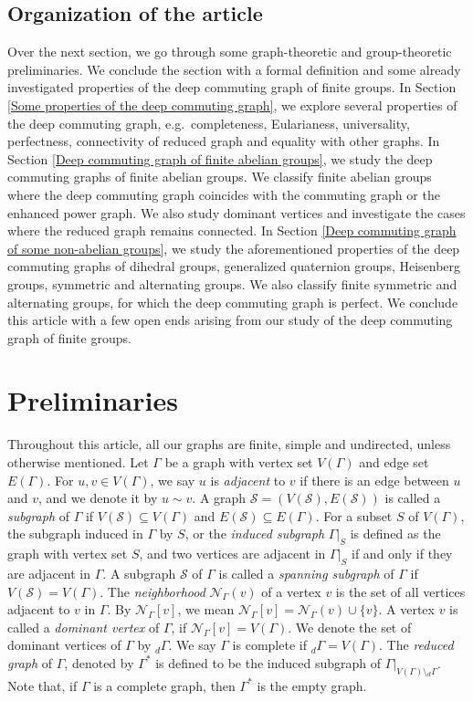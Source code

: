 \documentclass[12pt,a4paper]{article}
\begin{document}
\subsection{Organization of the article}

Over the next section, we go through some graph-theoretic and group-theoretic preliminaries. We conclude the section with a formal definition and some already investigated properties of the deep commuting graph of finite groups. In Section \ref{Some properties of the deep commuting graph}, we explore several properties of the deep commuting graph, e.g.~completeness, Eularianess, universality, perfectness, connectivity of reduced graph and equality with other graphs. In Section \ref{Deep commuting graph of finite abelian groups}, we study the deep commuting graphs of finite abelian groups. We classify finite abelian groups where the deep commuting graph coincides with the commuting graph or the enhanced power graph. We also study dominant vertices and investigate the cases where the reduced graph remains connected. In Section \ref{Deep commuting graph of some non-abelian groups}, we study the aforementioned properties of the deep commuting graphs of dihedral groups, generalized quaternion groups, Heisenberg groups, symmetric and alternating groups. We also classify finite symmetric and alternating groups, for which the deep commuting graph is perfect. We conclude this article with a few open ends arising from our study of the deep commuting graph of finite groups.

\section{Preliminaries}\label{Preliminaries}

Throughout this article, all our graphs are finite, simple and undirected, unless otherwise mentioned. Let $\Gamma$ be a graph with vertex set $V(\Gamma)$ and edge set $E(\Gamma)$. For $u,v\in V(\Gamma)$, we say $u$ is \emph{adjacent} to $v$ if there is an edge between $u$ and $v$, and we denote it by $u \sim v$.  A graph $\mathcal{S}=(V(\mathcal{S}),E(\mathcal{S}))$ is called a \textit{subgraph} of $\Gamma$ if $V(\mathcal{S})\subseteq V(\Gamma)$ and $E(\mathcal{S})\subseteq E(\Gamma)$. For a subset $S$ of $V(\Gamma)$, the subgraph induced in $\Gamma$ by $S$, or the \textit{induced subgraph} $\Gamma\vert_S$ is defined as the graph with vertex set $S$, and two vertices are adjacent in $\Gamma\vert_S$ if and only if they are adjacent in $\Gamma$. A subgraph $\mathcal{S}$ of $\Gamma$ is called a \textit{spanning subgraph} of $\Gamma$ if $V(\mathcal{S})=V(\Gamma)$. The \emph{neighborhood} $\mathcal{N}_{\Gamma}(v)$ of a vertex $v$ is the set of all vertices adjacent to $v$ in $\Gamma$. By $\mathcal{N}_{\Gamma}[v]$, we mean $\mathcal{N}_{\Gamma}[v]=\mathcal{N}_{\Gamma}(v)\cup \{v\}$. A vertex $v$ is called a \emph{dominant vertex} of $\Gamma$, if $\mathcal{N}_{\Gamma}[v]=V(\Gamma)$. We denote the set of dominant vertices of $\Gamma$ by $_d\Gamma$. We say $\Gamma$ is complete if $_d\Gamma =V(\Gamma)$. The \textit{reduced graph} of $\Gamma$, denoted by $\Gamma^*$ is defined to be the induced subgraph of $\Gamma\vert_{V(\Gamma)\setminus{_d}\Gamma}$. Note that, if $\Gamma$ is a complete graph, then $\Gamma^*$ is the empty graph.
\end{document}
